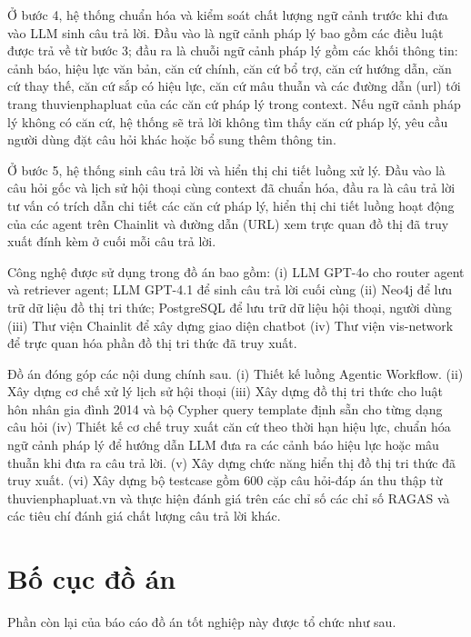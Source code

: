 \documentclass[../DoAn.tex]{subfiles}
\begin{document}
Ở bước 4, hệ thống chuẩn hóa và kiểm soát chất lượng ngữ cảnh trước khi đưa vào LLM sinh câu trả lời. Đầu vào là ngữ cảnh pháp lý bao gồm các điều luật được trả về từ bước 3; đầu ra là chuỗi ngữ cảnh pháp lý gồm các khối thông tin: cảnh báo, hiệu lực văn bản, căn cứ chính, căn cứ bổ trợ, căn cứ hướng dẫn, căn cứ thay thế, căn cứ sắp có hiệu lực, căn cứ mâu thuẫn và các đường dẫn (url) tới trang thuvienphapluat của các căn cứ pháp lý trong context. Nếu ngữ cảnh pháp lý không có căn cứ, hệ thống sẽ trả lời không tìm thấy căn cứ pháp lý, yêu cầu người dùng đặt câu hỏi khác hoặc bổ sung thêm thông tin.


Ở bước 5, hệ thống sinh câu trả lời và hiển thị chi tiết luồng xử lý. Đầu vào là câu hỏi gốc và lịch sử hội thoại cùng context đã chuẩn hóa, đầu ra là câu trả lời tư vấn có trích dẫn chi tiết các căn cứ pháp lý, hiển thị chi tiết luồng hoạt động của các agent trên Chainlit và đường dẫn (URL) xem trực quan đồ thị đã truy xuất đính kèm ở cuối mỗi câu trả lời.


Công nghệ được sử dụng trong đồ án bao gồm: (i) LLM GPT-4o cho router agent và retriever agent; LLM GPT-4.1 để sinh câu trả lời cuối cùng (ii) Neo4j \cite{Neo4jDoc} để lưu trữ dữ liệu đồ thị tri thức; PostgreSQL \cite{PostgreSQLDoc} để lưu trữ dữ liệu hội thoại, người dùng (iii) Thư viện Chainlit \cite{ChainlitDoc} để xây dựng giao diện chatbot (iv) Thư viện vis-network \cite{vis-networkDoc} để trực quan hóa phần đồ thị tri thức đã truy xuất.


Đồ án đóng góp các nội dung chính sau. (i) Thiết kế luồng Agentic Workflow. (ii) Xây dựng cơ chế xử lý lịch sử hội thoại (iii) Xây dựng đồ thị tri thức cho luật hôn nhân gia đình 2014 và bộ Cypher query template định sẵn cho từng dạng câu hỏi (iv) Thiết kế cơ chế truy xuất căn cứ theo thời hạn hiệu lực, chuẩn hóa ngữ cảnh pháp lý để hướng dẫn LLM đưa ra các cảnh báo hiệu lực hoặc mâu thuẫn khi đưa ra câu trả lời. (v) Xây dựng chức năng hiển thị đồ thị tri thức đã truy xuất. (vi) Xây dựng bộ testcase gồm 600 cặp câu hỏi-đáp án thu thập từ thuvienphapluat.vn và thực hiện đánh giá trên các chỉ số các chỉ số RAGAS và các tiêu chí đánh giá chất lượng câu trả lời khác.


\section{Bố cục đồ án}
\label{section:1.4}


Phần còn lại của báo cáo đồ án tốt nghiệp này được tổ chức như sau.
\end{document}
